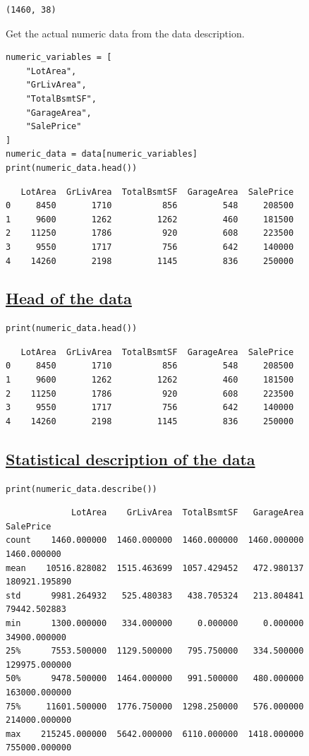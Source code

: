 \documentclass[11pt]{article}
\begin{document}
\label{org2ddf84f}
\begin{verbatim}
(1460, 38)
\end{verbatim}


Get the actual numeric data from the data description.
\begin{verbatim}
numeric_variables = [
    "LotArea",
    "GrLivArea",
    "TotalBsmtSF",
    "GarageArea",
    "SalePrice"
]
numeric_data = data[numeric_variables]
print(numeric_data.head())
\end{verbatim}

\label{orgf8c8645}
\begin{verbatim}
   LotArea  GrLivArea  TotalBsmtSF  GarageArea  SalePrice
0     8450       1710          856         548     208500
1     9600       1262         1262         460     181500
2    11250       1786          920         608     223500
3     9550       1717          756         642     140000
4    14260       2198         1145         836     250000
\end{verbatim}
\subsection{\href{https://pandas.pydata.org/docs/reference/api/pandas.DataFrame.head.html}{Head of the data}}
\label{sec:orgf5d4540}
\begin{verbatim}
print(numeric_data.head())
\end{verbatim}

\label{org6e35c4e}
\begin{verbatim}
   LotArea  GrLivArea  TotalBsmtSF  GarageArea  SalePrice
0     8450       1710          856         548     208500
1     9600       1262         1262         460     181500
2    11250       1786          920         608     223500
3     9550       1717          756         642     140000
4    14260       2198         1145         836     250000
\end{verbatim}
\subsection{\href{https://pandas.pydata.org/docs/reference/api/pandas.DataFrame.describe.html}{Statistical description of the data}}
\label{sec:org8f114ac}
\begin{verbatim}
print(numeric_data.describe())
\end{verbatim}

\label{org3ef427d}
\begin{verbatim}
             LotArea    GrLivArea  TotalBsmtSF   GarageArea      SalePrice
count    1460.000000  1460.000000  1460.000000  1460.000000    1460.000000
mean    10516.828082  1515.463699  1057.429452   472.980137  180921.195890
std      9981.264932   525.480383   438.705324   213.804841   79442.502883
min      1300.000000   334.000000     0.000000     0.000000   34900.000000
25%      7553.500000  1129.500000   795.750000   334.500000  129975.000000
50%      9478.500000  1464.000000   991.500000   480.000000  163000.000000
75%     11601.500000  1776.750000  1298.250000   576.000000  214000.000000
max    215245.000000  5642.000000  6110.000000  1418.000000  755000.000000
\end{verbatim}
\end{document}
